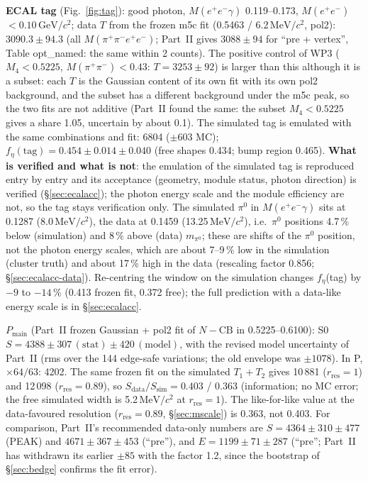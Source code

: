 \documentclass[11pt,a4paper]{article}
\newcommand{\piz}{\ensuremath{\pi^{0}}\xspace}
\newcommand{\ee}{\ensuremath{e^{+}e^{-}}\xspace}
\newcommand{\Mfour}{\ensuremath{M(\pi^{+}\pi^{-}e^{+}e^{-})}\xspace}
\newcommand{\Mee}{\ensuremath{M(e^{+}e^{-})}\xspace}
\newcommand{\Mpipi}{\ensuremath{M(\pi^{+}\pi^{-})}\xspace}
\newcommand{\GeVcc}{\ensuremath{\mathrm{GeV}/c^{2}}\xspace}
\newcommand{\MeVcc}{\ensuremath{\mathrm{MeV}/c^{2}}\xspace}
\newcommand{\Pmain}{\ensuremath{P_{\mathrm{main}}}\xspace}
\begin{document}
\textbf{ECAL tag} (Fig.~\ref{fig:tag}): good photon, $M(\ee\gamma)$ 0.119--0.173, \Mee$<0.10$\,\GeVcc; data $T$ from the frozen m5c fit
(0.5463 / 6.2\,\MeVcc, pol2): $3090.3\pm94.3$ (all \Mfour; Part~II gives $3088\pm94$ for ``pre + vertex'', Table opt\_named: the same within
2 counts). The positive control of WP3 ($M_4<0.5225$, \Mpipi$<0.43$: $T=3253\pm92$) is larger than this although it is a subset: each $T$ is the
Gaussian content of its own fit with its own pol2 background, and the subset has a different background under the m5c peak, so the two fits
are not additive (Part~II found the same: the subset $M_4<0.5225$ gives a share 1.05, uncertain by about 0.1). The simulated tag is emulated
with the same combinations and fit: 6804 ($\pm603$ MC);
$f_\eta(\mathrm{tag})=0.454\pm0.014\pm0.040$ (free shapes 0.434; bump region 0.465). \textbf{What is verified and what is not}: the emulation
of the simulated tag is reproduced entry by entry and its acceptance (geometry, module status, photon direction) is verified (\S\ref{sec:ecalacc});
the photon energy scale and the module efficiency are not, so the tag stays verification only. The simulated \piz in $M(\ee\gamma)$ sits at
0.1287 (8.0\,\MeVcc), the data at 0.1459 (13.25\,\MeVcc), i.e.\ \piz positions 4.7\,\% below (simulation) and 8\,\% above (data) $m_{\piz}$; these
are shifts of the \piz position, not the photon energy scales, which are about 7--9\,\% low in the simulation (cluster truth) and about 17\,\% high
in the data (rescaling factor 0.856; \S\ref{sec:ecalacc-data}). Re-centring the window on the simulation changes $f_\eta$(tag) by $-9$ to $-14$\,\%
(0.413 frozen fit, 0.372 free); the full prediction with a data-like energy scale is in \S\ref{sec:ecalacc}.

\textbf{\Pmain} (Part~II frozen Gaussian + pol2 fit of $N-\mathrm{CB}$ in 0.5225--0.6100): S0 $S=4388\pm307\,(\mathrm{stat})\pm420\,(\mathrm{model})$,
with the revised model uncertainty of Part~II (rms over the 144 edge-safe variations; the old envelope was $\pm1078$). In P, $\times64/63$: 4202.
The same frozen fit on the simulated $T_1+T_2$ gives 10\,881 ($r_{\mathrm{res}}=1$) and 12\,098 ($r_{\mathrm{res}}=0.89$), so $S_{\mathrm{data}}/S_{\mathrm{sim}}=0.403$ / 0.363
(information; no MC error; the free simulated width is 5.2\,\MeVcc at $r_{\mathrm{res}}=1$). The like-for-like value at the data-favoured
resolution ($r_{\mathrm{res}}=0.89$, \S\ref{sec:mscale}) is 0.363, not 0.403. For comparison, Part~II's recommended data-only numbers are
$S=4364\pm310\pm477$ (PEAK) and $4671\pm367\pm453$ (``pre''), and $E=1199\pm71\pm287$ (``pre''; Part~II has withdrawn its earlier $\pm85$ with the factor 1.2, since the bootstrap of
\S\ref{sec:bedge} confirms the fit error).
\end{document}
